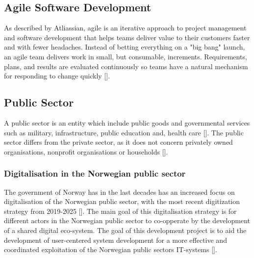 \subsection{Agile Software Development}
As described by Atliassian, agile is an iterative approach to project management and software development that helps teams deliver value to their customers faster and with fewer headaches. Instead of betting everything on a "big bang" launch, an agile team delivers work in small, but consumable, increments. Requirements, plans, and results are evaluated continuously so teams have a natural mechanism for responding to change quickly [\cite{a_2022}]. 

\subsection{Public Sector}
A public sector is an entity which include public goods and governmental services such as military, infrastructure, public education and, health care [\cite{ps_2022}]. The public sector differs from the private sector, as it does not concern privately owned organisations, nonprofit organisations or households [\cite{os_2022}]. 

\subsubsection{Digitalisation in the Norwegian public sector}
The government of Norway has in the last decades has an increased focus on digitalisation of the Norwegian public sector, with the most recent digitization strategy from 2019-2025 [\cite{r_2019}]. The main goal of this digitalisation strategy is for different actors in the Norwegian public sector to co-opperate by the development of a shared digital eco-system. The goal of this development project is to aid the development of user-centered system development for a more effective and coordinated exploitation of the Norwegian public sectors IT-systems [\cite{r_2019}].